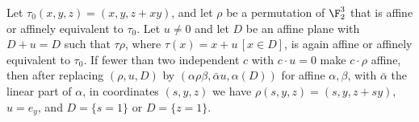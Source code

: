 Let $\tau_0(x,y,z)=(x,y,z+xy)$, and let $\rho$ be a permutation of $\F_2^3$ that is affine or affinely equivalent to $\tau_0$. Let $u\ne0$ and let $D$ be an affine plane with $D+u=D$ such that $\tau\rho$, where $\tau(x)=x+u\,[x\in D]$, is again affine or affinely equivalent to $\tau_0$. If fewer than two independent $c$ with $c\cdot u=0$ make $c\cdot\rho$ affine, then after replacing $(\rho,u,D)$ by $(\alpha\rho\beta,\bar\alpha u,\alpha(D))$ for affine $\alpha,\beta$, with $\bar\alpha$ the linear part of $\alpha$, in coordinates $(s,y,z)$ we have $\rho(s,y,z)=(s,y,z+sy)$, $u=e_y$, and $D=\{s=1\}$ or $D=\{z=1\}$.
